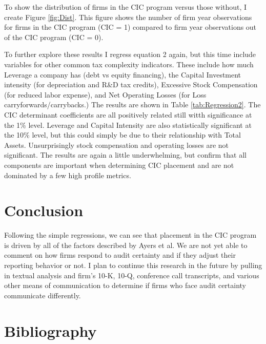 \documentclass[12pt]{article}
\begin{document}
To show the distribution of firms in the CIC program versus those without, I create Figure \ref{fig:Dist}. This figure shows the number of firm year observations for firms in the CIC program (CIC = 1) compared to firm year observations out of the CIC program (CIC = 0).
\vspace{\baselineskip}

To further explore these results I regress equation 2 again, but this time include variables for other common tax complexity indicators. These include how much Leverage a company has (debt vs equity financing), the Capital Investment intensity (for depreciation and R\&D tax credits), Excessive Stock Compensation (for reduced labor expense), and Net Operating Losses (for Loss carryforwards/carrybacks.) The results are shown in Table \ref{tab:Regression2}. The CIC determinant coefficients are all positively related still witth significance at the 1\% level. Leverage and Capital Intensity are also statistically significant at the 10\% level, but this could simply be due to their relationship with Total Assets. Unsurprisingly stock compensation and operating losses are not significant. The results are again a little underwhelming, but confirm that all components are important when determining CIC placement and are not dominated by a few high profile metrics.


\section{Conclusion}
Following the simple regressions, we can see that placement in the CIC program is driven by all of the factors described by Ayers et al. \citep{Ayers2019} We are not yet able to comment on how firms respond to audit certainty and if they adjust their reporting behavior or not. I plan to continue this research in the future by pulling in textual analysis and firm's 10-K, 10-Q, conference call transcripts, and various other means of communication to determine if firms who face audit certainty communicate differently. 

\section{Bibliography}
\nocite{*}


\vspace{\baselineskip}
\vspace{\baselineskip}
\vspace{\baselineskip}
\vspace{\baselineskip}
\end{document}
